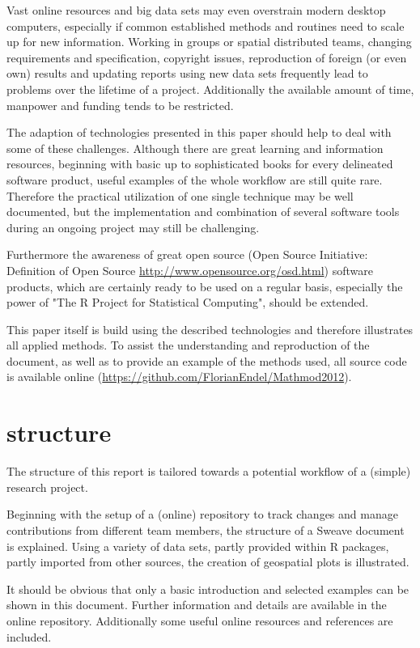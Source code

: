 \documentclass{ifacconf}
\begin{document}
Vast online resources and big data sets may even overstrain
modern desktop computers, especially if common established methods
and routines need to scale up for new information. 
Working in groups or spatial distributed teams,  
changing requirements and specification, copyright issues, reproduction of 
foreign (or even own) results  and updating reports using new data sets frequently
lead to problems over the lifetime of a project. 
Additionally the available amount of time, manpower and funding tends to be restricted.

The adaption of technologies presented in this paper should help to deal with
some of these challenges. Although there are great learning and information resources, 
beginning with 
basic up to sophisticated books for every delineated software product,
useful examples of the whole workflow are still quite rare. Therefore the 
practical utilization of one single technique may be well documented, but
the implementation and combination of several software tools during an ongoing
project may still be challenging.

Furthermore the awareness of great open source
(Open Source Initiative: Definition of Open Source \url{http://www.opensource.org/osd.html}) 
software products, which are 
certainly ready to be used on a regular basis, especially the power of "The R Project
for Statistical Computing", should be extended.

This paper itself is build using the described technologies and therefore illustrates 
all applied methods. To assist the understanding and reproduction of the document, 
as well as to provide an example of the methods used, all source code is available 
online (\url{https://github.com/FlorianEndel/Mathmod2012}).

\section{structure}
The structure of this report is tailored towards a potential workflow of a (simple)
research project. 

Beginning with the setup of a (online) repository to track changes and manage 
contributions from different team members, the structure of a Sweave document is
explained. Using a variety of data sets, partly provided within R packages, partly
imported from other sources, the creation of geospatial plots is illustrated. 

It should be obvious that only a basic introduction and selected examples 
can be shown in this document. Further information and details 
are available in the online repository.
Additionally some useful online resources and references are included.
\end{document}
